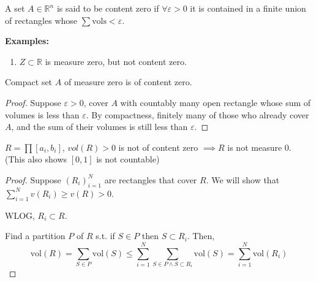 \documentclass[a4paper]{article}
\numberwithin{equation}{section}
\newcommand{\R}{\mathbb{R}}
\newcommand{\vol}{\mathrm{vol}}
\begin{document}
\begin{definition}
    A set $A\in\R^n$ is said to be content zero if $\forall\varepsilon>0$ it is contained in a finite union of rectangles whose $\sum\mathrm{vols}<\varepsilon$.

    \textbf{Examples:}
    \begin{enumerate}
        \item $Z\subset\R$ is measure zero, but not content zero.
    \end{enumerate}
\end{definition}
\begin{proposition}
    Compact set $A$ of measure zero is of content zero.
    \begin{proof}
        Suppose $\varepsilon>0$, cover $A$ with countably many open rectangle whose sum of volumes is less than $\varepsilon$. By compactness, finitely many of those who already cover $A$, and the sum of their volumes is still less than $\varepsilon$.
    \end{proof}
\end{proposition}
\begin{proposition}
    $R=\prod[a_i,b_i]$, $vol(R)>0$ is not of content zero $\implies R$ is not measure 0. (This also shows $[0,1]$ is not countable)
    \begin{proof}
        Suppose $(R_i)_{i=1}^N$ are rectangles that cover $R$. We will show that $\sum_{i=1}^Nv(R_i)\geq v(R)>0$.

        WLOG, $R_i\subset R$. 

        Find a partition $P$ of $R$ s.t. if $S\in P$ then $S\subset R_i$. Then, \begin{equation}
            \mathrm{vol}(R)=\sum_{S\in P}\mathrm{vol}(S)\leq\sum_{i=1}^N\sum_{S\in P\land S\subset R_i}\mathrm{vol}(S)=\sum_{i=1}^N\vol(R_i)
        \end{equation}
    \end{proof}
\end{proposition}
\end{document}
